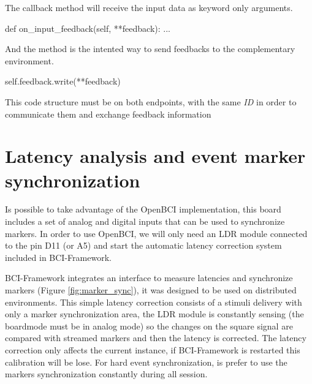 The callback method will receive the input data as keyword only arguments.
\begin{python}
def on_input_feedback(self, **feedback):
    ...
\end{python}

And the method  is the intented way to send feedbacks to the complementary environment.
\begin{python}
self.feedback.write(**feedback)
\end{python}

This code structure must be on both endpoints, with the same \textit{ID} in order to communicate them and exchange feedback information

\section{Latency analysis and event marker synchronization}


Is possible to take advantage of the OpenBCI implementation, this board includes a set of analog and digital inputs that can be used to synchronize markers. In order to use OpenBCI, we will only need an \gls*{LDR} module connected to the pin D11 (or A5) and start the automatic latency correction system included in BCI-Framework. 



BCI-Framework integrates an interface to measure latencies and synchronize markers (Figure \ref{fig:marker_sync}), it was designed to be used on distributed environments. This simple latency correction consists of a stimuli delivery with only a marker synchronization area, the \gls*{LDR} module is constantly sensing (the boardmode must be in analog mode) so the changes on the square signal are compared with streamed markers and then the latency is corrected. The latency correction only affects the current instance, if BCI-Framework is restarted this calibration will be lose. For hard event synchronization, is prefer to use the markers synchronization constantly during all session.


